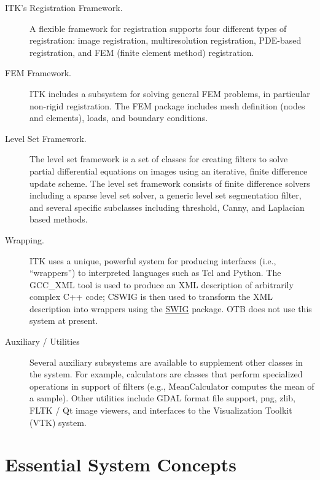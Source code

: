 \begin{description}
	\item[ITK's Registration Framework.] A flexible framework for
        registration supports four different types of registration:
        image registration, multiresolution registration, PDE-based
        registration, and FEM (finite element method) registration.

	\item[FEM Framework.] ITK includes a subsystem for solving general
        FEM problems, in particular non-rigid registration. The FEM package
        includes mesh definition (nodes and elements), loads, and boundary
        conditions.

	\item[Level Set Framework.] The level set framework is a set of
        classes for creating filters to solve partial differential equations
        on images using an iterative, finite difference update scheme. The
        level set framework consists of finite difference solvers including a
        sparse level set solver, a generic level set segmentation filter, and
        several specific subclasses including threshold, Canny, and Laplacian
        based methods.

	\item[Wrapping.] ITK uses a unique, powerful system for
	producing interfaces (i.e., ``wrappers'') to interpreted
	languages such as Tcl and Python. The GCC\_XML tool is used to
	produce an XML description of arbitrarily complex C++ code;
	CSWIG is then used to transform the XML description into
	wrappers using the \href{http://www.swig.org/}{SWIG}
	package. OTB does not use this system at present.

	\item[Auxiliary / Utilities] Several auxiliary subsystems are 
        available to supplement other classes in the system. For example,
        calculators are classes that perform specialized operations in
        support of filters (e.g., MeanCalculator computes the mean of a
        sample). Other utilities include GDAL format file
        support, png, zlib, FLTK / Qt image viewers, and interfaces to the
        Visualization Toolkit (VTK) system.
        
\end{description}


\section{Essential System Concepts}
\label{sec:EssentialSystemConcepts}

